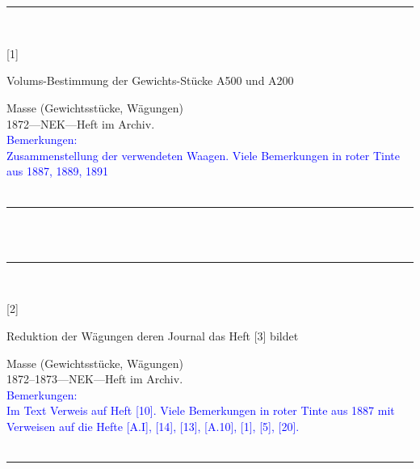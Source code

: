 \\
\vspace*{-2.5pt}\\
\parbox{\textwidth}{%
\rule{\textwidth}{1pt}\vspace*{-3mm}\\
\begin{minipage}[t]{0.1\textwidth}\vspace{0pt}
\Huge\rule[-4mm]{0cm}{1cm}[1]
\end{minipage}
\hfill
\begin{minipage}[t]{0.9\textwidth}\vspace{0pt}
\large Volums-Bestimmung der Gewichts-Stücke A500 und A200\rule[-2mm]{0mm}{2mm}
\end{minipage}
{\footnotesize\flushright
Masse (Gewichtsstücke, Wägungen)\\
}
1872\quad---\quad NEK\quad---\quad Heft im Archiv.\\
\textcolor{blue}{Bemerkungen:\\{}
Zusammenstellung der verwendeten Waagen. Viele Bemerkungen in roter Tinte aus 1887, 1889, 1891\\{}
}
\\[-15pt]
\rule{\textwidth}{1pt}
}
\\
\vspace*{-2.5pt}\\
\parbox{\textwidth}{%
\rule{\textwidth}{1pt}\vspace*{-3mm}\\
\begin{minipage}[t]{0.1\textwidth}\vspace{0pt}
\Huge\rule[-4mm]{0cm}{1cm}[2]
\end{minipage}
\hfill
\begin{minipage}[t]{0.9\textwidth}\vspace{0pt}
\large Reduktion der Wägungen deren Journal das Heft [3] bildet\rule[-2mm]{0mm}{2mm}
\end{minipage}
{\footnotesize\flushright
Masse (Gewichtsstücke, Wägungen)\\
}
1872--1873\quad---\quad NEK\quad---\quad Heft im Archiv.\\
\textcolor{blue}{Bemerkungen:\\{}
Im Text Verweis auf Heft [10]. Viele Bemerkungen in roter Tinte aus 1887 mit Verweisen auf die Hefte [A.I], [14], [13], [A.10], [1], [5], [20].\\{}
}
\\[-15pt]
\rule{\textwidth}{1pt}
}
